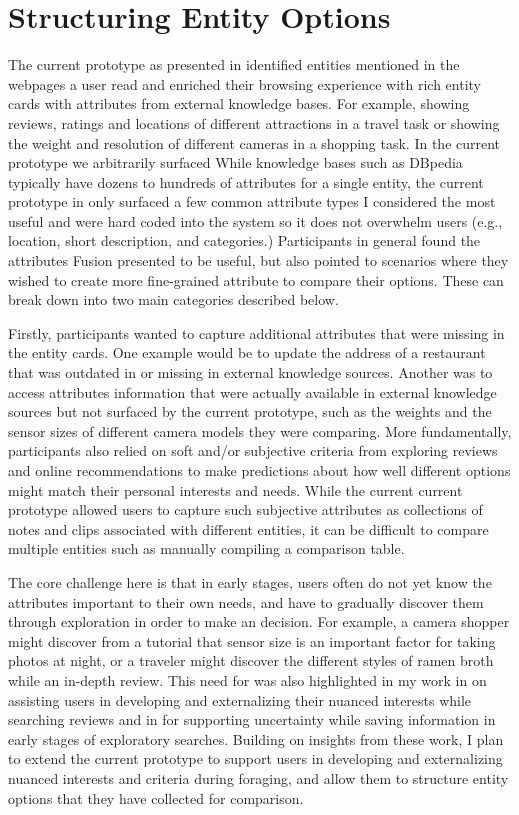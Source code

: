 \section{Structuring Entity Options}

The current prototype as presented in  identified entities mentioned in the webpages a user read and enriched their browsing experience with rich entity cards with attributes from external knowledge bases. For example, showing reviews, ratings and locations of different attractions in a travel task or showing the weight and resolution of different cameras in a shopping task. In the current prototype we arbitrarily surfaced 
While knowledge bases such as DBpedia \cite{dbpedia} typically have dozens to hundreds of attributes for a single entity, the current prototype in  only surfaced a few common attribute types I considered the most useful and were hard coded into the system so it does not overwhelm users (e.g., location, short description, and categories.) Participants in general found the attributes Fusion presented to be useful, but also pointed to scenarios where they wished to create more fine-grained attribute to compare their options. These can break down into two main categories described below.

Firstly, participants wanted to capture additional attributes that were missing in the entity cards. One example would be to update the address of a restaurant that was outdated in or missing in external knowledge sources. Another was to access attributes information that were actually available in external knowledge sources but not surfaced by the current prototype, such as the weights and the sensor sizes of different camera models they were comparing.
More fundamentally, participants also relied on soft and/or subjective criteria from exploring reviews and online recommendations to make predictions about how well different options might match their personal interests and needs. While the current current prototype allowed users to capture such subjective attributes as collections of notes and clips associated with different entities, it can be difficult to compare multiple entities such as manually compiling a comparison table.

The core challenge here is that in early stages, users often do not yet know the attributes important to their own needs, and have to gradually discover them through exploration in order to make an decision. For example, a camera shopper might discover from a tutorial that sensor size is an important factor for taking photos at night, or a traveler might discover the different styles of ramen broth while an in-depth review.
This need for was also highlighted in my work in  on assisting users in developing and externalizing their nuanced interests while searching reviews and in   for supporting uncertainty while saving information in early stages of exploratory searches. Building on insights from these work, I plan to extend the current prototype to support users in developing and externalizing nuanced interests and criteria during foraging, and allow them to structure entity options that they have collected for comparison.

